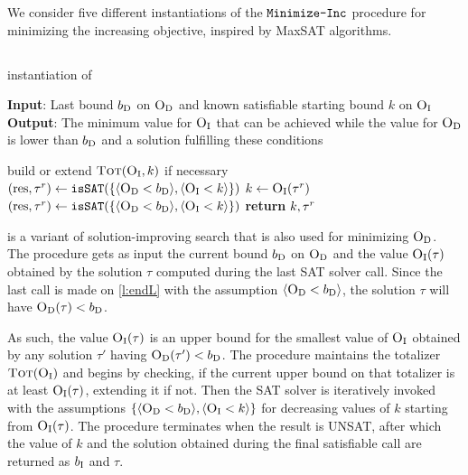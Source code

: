 We consider five different instantiations of the $\texttt{Minimize-\allowbreak{}Inc}$ procedure for minimizing the increasing objective, inspired by MaxSAT algorithms. 

\subsection{\satunsat{}\label{sec:sat-unsat}}

\begin{algorithm}[t]
  \caption{\satunsat{} instantiation of \Min{}}\label{alg:sat-unsat}
  \textbf{Input}: Last bound $b_{\text{D}}$ on $\textsc{O}_{\text{D}}$ and known satisfiable starting bound $k$ on $\textsc{O}_{\text{I}}$ \\
  \textbf{Output}: The minimum value for $\textsc{O}_{\text{I}}$ that can be achieved while the value for $\textsc{O}_{\text{D}}$ is lower than $b_{\text{D}}$ and a solution fulfilling these conditions

  \begin{algorithmic}[1]
    \STATE build or extend $\textsc{Tot}(\textsc{O}_{\text{I}},k)$ if necessary
    \STATE $(\text{res},\tau^r) \gets \texttt{isSAT}(\{\langle \textsc{O}_{\text{D}} < b_{\text{D}} \rangle, \langle \textsc{O}_{\text{I}} < k \rangle\})$
      \STATE $k \gets \textsc{O}_{\text{I}}(\tau^r)$
      \STATE $(\text{res},\tau^r) \gets \texttt{isSAT}(\{\langle \textsc{O}_{\text{D}} < b_{\text{D}} \rangle, \langle \textsc{O}_{\text{I}} < k \rangle\})$
    \ENDWHILE
    \STATE \textbf{return} $k,\tau^r$
  \end{algorithmic}
\end{algorithm}

\satunsat{} is a variant of solution-improving search that is also used for minimizing $\textsc{O}_{\text{D}}$. 
The procedure gets as input the current bound $b_{\text{D}}$ on $\textsc{O}_{\text{D}}$ and the value $\textsc{O}_{\text{I}}(\tau)$ obtained by the solution $\tau$ computed during the last SAT solver call. 
Since the last call is made on \cref{l:endL} with the assumption $\langle \textsc{O}_{\text{D}} < b_{\text{D}} \rangle$, the solution $\tau$ will have $\textsc{O}_{\text{D}}(\tau) < b_{\text{D}}$. 

As such, the value $\textsc{O}_{\text{I}}(\tau)$ is an upper bound for the smallest value of $\textsc{O}_{\text{I}}$ obtained by any solution $\tau'$ having $\textsc{O}_{\text{D}}(\tau') < b_{\text{D}}$.
The procedure \satunsat{} maintains the totalizer $\textsc{Tot}(\textsc{O}_{\text{I}})$ and begins by checking, if the current upper bound on that totalizer is at least $\textsc{O}_{\text{I}}(\tau)$, extending it if not. 
Then the SAT solver is iteratively invoked with the assumptions $\{\langle \textsc{O}_{\text{D}} < b_{\text{D}} \rangle, \langle \textsc{O}_{\text{I}} < k \rangle\}$ for decreasing values of $k$ starting from $\textsc{O}_{\text{I}}(\tau)$.
The procedure terminates when the result is UNSAT, after which the value of $k$ and the solution obtained during the final satisfiable call are returned as $b_{\text{I}}$ and $\tau$.  

